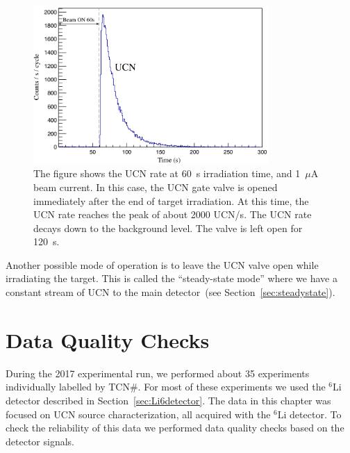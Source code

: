 \begin{figure}[h!]
  \centering
  \includegraphics[width=0.8\textwidth]{UCNRate.png}
  \caption[UCN rate at 1~$\mu$A beam current and 60~s target
  irradiation]{The figure shows the UCN rate at 60~s irradiation time,
    and 1~$\mu$A beam current. In this case, the UCN gate valve is
    opened immediately after the end of target irradiation. At this
    time, the UCN rate reaches the peak of about 2000 UCN/s. The UCN
    rate decays down to the background level. The valve is left open
    for 120~s. }
  \label{fig:UCNRate}
\end{figure}


Another possible mode of operation is to leave the UCN valve open
while irradiating the target. This is called the ``steady-state mode''
where we have a constant stream of UCN to the main detector~(see
Section~\ref{sec:steadystate}).



\section {Data Quality Checks~\label{sec:DQC}}
During the 2017 experimental run, we performed about 35 experiments
individually labelled by TCN\#. For most of these experiments we used
the $^6\mathrm{Li}$ detector described in
Section~\ref{sec:Li6detector}. The data in this chapter was focused on
UCN source characterization, all acquired with the $^6\mathrm{Li}$
detector.  To check the reliability of this data we performed data
quality checks based on the detector signals.



